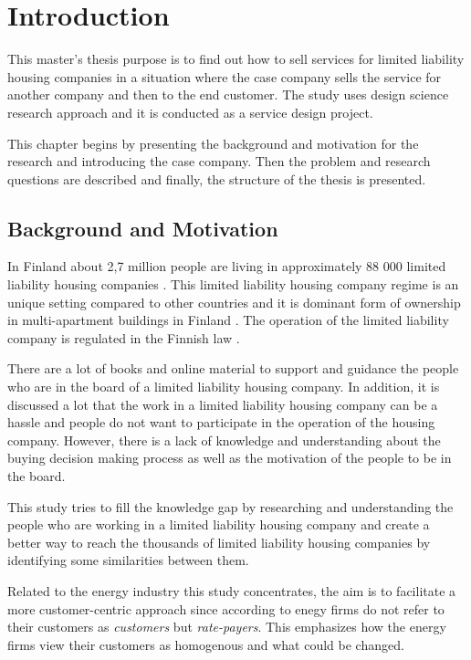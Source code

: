 \chapter{Introduction}
\label{chapter:intro}

This master's thesis purpose is to find out how to sell services for limited liability housing companies in a situation where the case company sells the service for another company and then to the end customer. The study uses design science research approach and it is conducted as a service design project.

This chapter begins by presenting the background and motivation for the research and introducing the case company. Then the problem and research questions are described and finally, the structure of the thesis is presented.

\section{Background and Motivation}

In Finland about 2,7 million people are living in approximately 88 000 limited liability housing companies \parencite{REMF, Stats}. This limited liability housing company regime is an unique setting compared to other countries and it is dominant form of ownership in multi-apartment buildings in Finland \parencite{Lujanen:2017}. The operation of the limited liability company is regulated in the Finnish law \parencite{YIT}.

There are a lot of books and online material to support and guidance the people who are in the board of a limited liability housing company. In addition, it is discussed a lot that the work in a limited liability housing company can be a hassle and people do not want to participate in the operation of the housing company. However, there is a lack of knowledge and understanding about the buying decision making process as well as the motivation of the people to be in the board.

This study tries to fill the knowledge gap by researching and understanding the people who are working in a limited liability housing company and create a better way to reach the thousands of limited liability housing companies by identifying some similarities between them.

Related to the energy industry this study concentrates, the aim is to facilitate a more customer-centric approach since according to \textcite{Fader:2012} enegy firms do not refer to their customers as \emph{customers} but \emph{rate-payers}. This emphasizes how the energy firms view their customers as homogenous and what could be changed.

